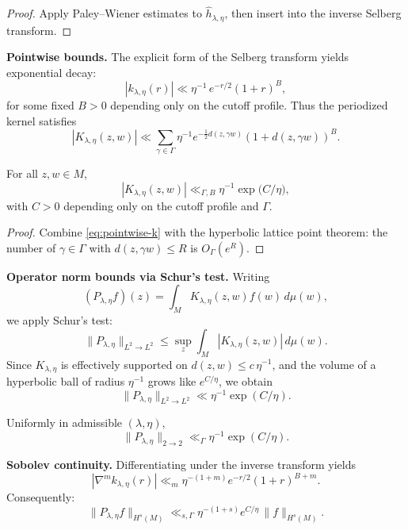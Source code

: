 \begin{proof}
Apply Paley–Wiener estimates to $\widehat{h}_{\lambda,\eta}$, then insert
into the inverse Selberg transform.
\end{proof}

\medskip
\noindent\textbf{Pointwise bounds.}
The explicit form of the Selberg transform yields exponential decay:
\begin{equation}\label{eq:pointwise-k}
  |k_{\lambda,\eta}(r)| \ll \eta^{-1}\, e^{-r/2}(1+r)^B,
\end{equation}
for some fixed $B>0$ depending only on the cutoff profile.
Thus the periodized kernel satisfies
\[
  |K_{\lambda,\eta}(z,w)| \ll \sum_{\gamma\in\Gamma}
    \eta^{-1} e^{-\tfrac12 d(z,\gamma w)}(1+d(z,\gamma w))^B.
\]

\begin{lemma}
\label{lem:pointwise-K}
For all $z,w\in M$,
\[
  |K_{\lambda,\eta}(z,w)| \ll_{\Gamma,B}
     \eta^{-1} \exp\!\big(C/\eta\big),
\]
with $C>0$ depending only on the cutoff profile and $\Gamma$.
\end{lemma}

\begin{proof}
Combine \eqref{eq:pointwise-k} with the hyperbolic lattice point theorem:
the number of $\gamma\in\Gamma$ with $d(z,\gamma w)\le R$ is $O_\Gamma(e^R)$.
\end{proof}

\medskip
\noindent\textbf{Operator norm bounds via Schur’s test.}
Writing
\[
  (P_{\lambda,\eta}f)(z)=\int_M K_{\lambda,\eta}(z,w)f(w)\,d\mu(w),
\]
we apply Schur’s test:
\[
  \|P_{\lambda,\eta}\|_{L^2\to L^2}
   \le \sup_z\int_M |K_{\lambda,\eta}(z,w)|\,d\mu(w).
\]
Since $K_{\lambda,\eta}$ is effectively supported on $d(z,w)\le c\,\eta^{-1}$,
and the volume of a hyperbolic ball of radius $\eta^{-1}$ grows like $e^{C/\eta}$,
we obtain
\[
  \|P_{\lambda,\eta}\|_{L^2\to L^2} \ll \eta^{-1}\exp(C/\eta).
\]

\begin{lemma}\label{lem:schur}
Uniformly in admissible $(\lambda,\eta)$,
\[
  \|P_{\lambda,\eta}\|_{2\to 2}
  \ll_{\Gamma} \eta^{-1}\exp(C/\eta).
\]
\end{lemma}

\medskip
\noindent\textbf{Sobolev continuity.}
Differentiating under the inverse transform yields
\[
  |\nabla^m k_{\lambda,\eta}(r)| \ll_m \eta^{-(1+m)} e^{-r/2}(1+r)^{B+m}.
\]
Consequently:
\begin{equation}\label{eq:sobolev-P}
  \|P_{\lambda,\eta}f\|_{H^s(M)} \ll_{s,\Gamma}
  \eta^{-(1+s)} e^{C/\eta}\,\|f\|_{H^s(M)}.
\end{equation}

